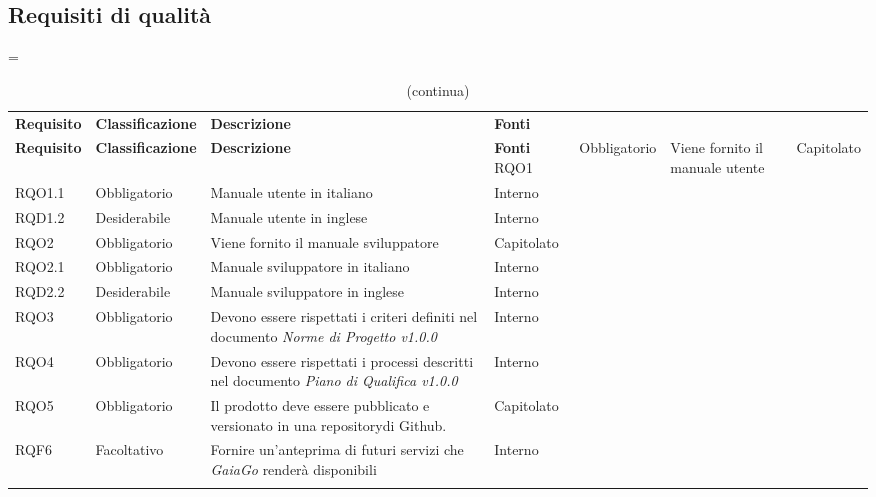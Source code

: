 \subsection{Requisiti di qualità}

\LTcapwidth=\linewidth
\begin{longtable}{ >{\centering}p{} >{\centering}p{}
		>{\raggedright}p{} >{\centering}p{}}
	\caption{Tabella dei requisiti di qualità}\\
	\rowcolorhead 
	\textbf{\color{white}Requisito} 
	& \textbf{\color{white}Classificazione} 
	& \centering\textbf{\color{white}Descrizione}
	& \textbf{\color{white}Fonti} 
	\endfirsthead
	\caption[]{(continua)}\\
	\rowcolorhead 
	\textbf{\color{white}Requisito} 
	& \textbf{\color{white}Classificazione} 
	& \centering\textbf{\color{white}Descrizione}
	& \textbf{\color{white}Fonti} 
	\endhead
	RQO1	&	Obbligatorio	&	Viene fornito il manuale utente	&	Capitolato	\tabularnewline
	RQO1.1	&	Obbligatorio	&	Manuale utente in italiano	&	Interno	\tabularnewline
	RQD1.2	&	Desiderabile	&	Manuale utente in inglese	&	Interno	\tabularnewline
	RQO2	&	Obbligatorio	&	Viene fornito il manuale sviluppatore	&	Capitolato	\tabularnewline
	RQO2.1	&	Obbligatorio	&		Manuale sviluppatore in italiano	&	Interno	\tabularnewline
	RQD2.2	&	Desiderabile	&		Manuale sviluppatore in inglese	&	Interno	\tabularnewline
	RQO3	&	Obbligatorio	&		Devono essere rispettati i criteri definiti nel documento \textit{Norme di Progetto v1.0.0}	&	Interno	\tabularnewline
	RQO4	& Obbligatorio	& 	Devono essere rispettati i processi descritti nel documento \textit{Piano di Qualifica v1.0.0} &	Interno \tabularnewline
	RQO5	&	Obbligatorio	&	Il prodotto deve essere pubblicato e versionato in una repository\glosp di Github\glo.	&	Capitolato
	\tabularnewline
	RQF6	&	Facoltativo	& Fornire un'anteprima di futuri servizi che \textit{GaiaGo} renderà disponibili  &	Interno  \\ 	\tabularnewline
	
\end{longtable}
	


